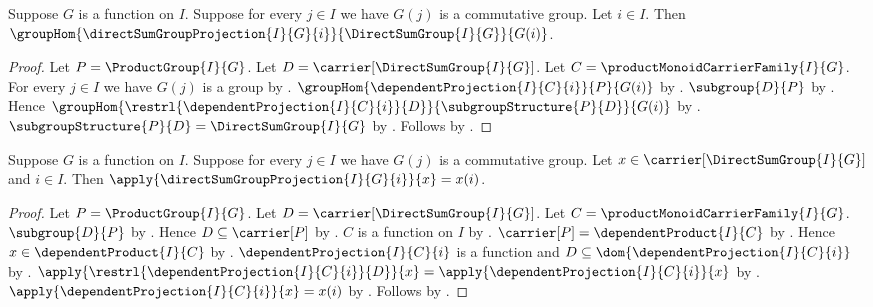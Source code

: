 \begin{theorem}\label{direct_sum_group_projection_hom}
    Suppose $G$ is a function on $I$.
    Suppose for every $j\in I$ we have $G(j)$ is a commutative group.
    Let $i\in I$.
    Then
        $\groupHom{\directSumGroupProjection{I}{G}{i}}{
            \DirectSumGroup{I}{G}}{G(i)}$.
\end{theorem}
\begin{proof}
    Let $P=\ProductGroup{I}{G}$.
    Let $D=\carrier[\DirectSumGroup{I}{G}]$.
    Let $C=\productMonoidCarrierFamily{I}{G}$.
    For every $j\in I$ we have $G(j)$ is a group by
        .
    $\groupHom{\dependentProjection{I}{C}{i}}{P}{G(i)}$ by
        .
    $\subgroup{D}{P}$ by
        .
    Hence
        $\groupHom{\restrl{\dependentProjection{I}{C}{i}}{D}}{
            \subgroupStructure{P}{D}}{G(i)}$ by
        .
    $\subgroupStructure{P}{D}=\DirectSumGroup{I}{G}$ by
        .
    Follows by .
\end{proof}

\begin{proposition}\label{direct_sum_group_projection_apply}
    Suppose $G$ is a function on $I$.
    Suppose for every $j\in I$ we have $G(j)$ is a commutative group.
    Let $x\in\carrier[\DirectSumGroup{I}{G}]$ and $i\in I$.
    Then $\apply{\directSumGroupProjection{I}{G}{i}}{x}=x(i)$.
\end{proposition}
\begin{proof}
    Let $P=\ProductGroup{I}{G}$.
    Let $D=\carrier[\DirectSumGroup{I}{G}]$.
    Let $C=\productMonoidCarrierFamily{I}{G}$.
    $\subgroup{D}{P}$ by
        .
    Hence $D\subseteq\carrier[P]$ by .
    $C$ is a function on $I$ by
        .
    $\carrier[P]=\dependentProduct{I}{C}$ by
        .
    Hence $x\in\dependentProduct{I}{C}$ by .
    $\dependentProjection{I}{C}{i}$ is a function and
        $D\subseteq\dom{\dependentProjection{I}{C}{i}}$ by
        .
    $\apply{\restrl{\dependentProjection{I}{C}{i}}{D}}{x}
        =\apply{\dependentProjection{I}{C}{i}}{x}$ by
        .
    $\apply{\dependentProjection{I}{C}{i}}{x}=x(i)$ by
        .
    Follows by .
\end{proof}

